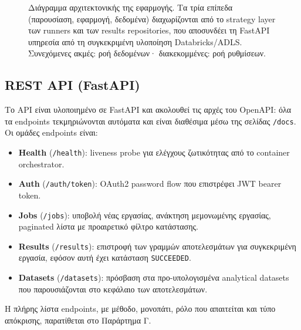 \documentclass[12pt]{article}
\begin{document}
\begin{figure}[H]
\caption{Διάγραμμα αρχιτεκτονικής της εφαρμογής. Τα τρία επίπεδα (παρουσίαση, εφαρμογή, δεδομένα) διαχωρίζονται από το strategy layer των runners και των results repositories, που αποσυνδέει τη FastAPI υπηρεσία από τη συγκεκριμένη υλοποίηση Databricks/ADLS. Συνεχόμενες ακμές: ροή δεδομένων· διακεκομμένες: ροή ρυθμίσεων.}
\label{fig:architecture}
\end{figure}

\subsection{REST API (FastAPI)}
Το API είναι υλοποιημένο σε FastAPI και ακολουθεί τις αρχές του OpenAPI: όλα τα endpoints τεκμηριώνονται αυτόματα και είναι διαθέσιμα μέσω της σελίδας \texttt{/docs}. Οι ομάδες endpoints είναι:
\begin{itemize}
  \item \textbf{Health} (\texttt{/health}): liveness probe για ελέγχους ζωτικότητας από το container orchestrator.
  \item \textbf{Auth} (\texttt{/auth/token}): OAuth2 password flow που επιστρέφει JWT bearer token.
  \item \textbf{Jobs} (\texttt{/jobs}): υποβολή νέας εργασίας, ανάκτηση μεμονωμένης εργασίας, paginated λίστα με προαιρετικό φίλτρο κατάστασης.
  \item \textbf{Results} (\texttt{/results}): επιστροφή των γραμμών αποτελεσμάτων για συγκεκριμένη εργασία, εφόσον αυτή έχει κατάσταση \texttt{SUCCEEDED}.
  \item \textbf{Datasets} (\texttt{/datasets}): πρόσβαση στα προ-υπολογισμένα analytical datasets που παρουσιάζονται στο κεφάλαιο των αποτελεσμάτων.
\end{itemize}
Η πλήρης λίστα endpoints, με μέθοδο, μονοπάτι, ρόλο που απαιτείται και τύπο απόκρισης, παρατίθεται στο Παράρτημα Γ.
\end{document}
